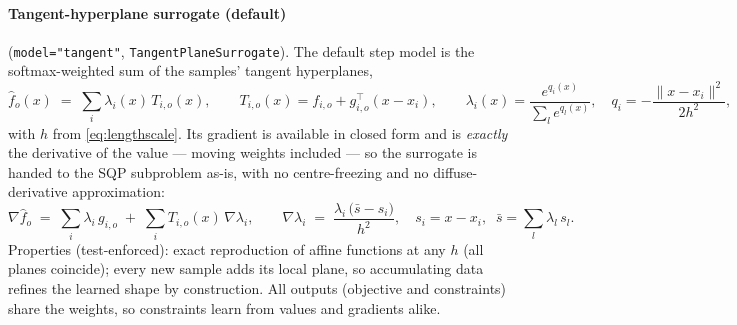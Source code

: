 \documentclass[11pt,a4paper]{article}
\newcommand{\code}[1]{\texttt{#1}}
\begin{document}
\paragraph{Tangent-hyperplane surrogate (default)}
(\code{model="tangent"}, \code{TangentPlaneSurrogate}). The default step
model is the softmax-weighted sum of the samples' tangent hyperplanes,
\begin{equation}
\hat f_o(x) \;=\; \sum_{i} \lambda_i(x)\, T_{i,o}(x), \qquad
T_{i,o}(x) = f_{i,o} + g_{i,o}^{\top}(x - x_i), \qquad
\lambda_i(x) = \frac{e^{q_i(x)}}{\sum_l e^{q_l(x)}}, \quad
q_i = -\frac{\lVert x - x_i\rVert^2}{2h^2},
\label{eq:tangent}
\end{equation}
with $h$ from \eqref{eq:lengthscale}. Its gradient is available in closed
form and is \emph{exactly} the derivative of the value --- moving weights
included --- so the surrogate is handed to the SQP subproblem as-is, with no
centre-freezing and no diffuse-derivative approximation:
\begin{equation}
\nabla \hat f_o \;=\; \sum_i \lambda_i\, g_{i,o}
\;+\; \sum_i T_{i,o}(x)\, \nabla\lambda_i,
\qquad
\nabla\lambda_i \;=\; \frac{\lambda_i\,\bigl(\bar s - s_i\bigr)}{h^2},
\quad s_i = x - x_i,\;\; \bar s = \sum_l \lambda_l\, s_l .
\end{equation}
Properties (test-enforced): exact reproduction of affine functions at any
$h$ (all planes coincide); every new sample adds its local plane, so
accumulating data refines the learned shape by construction. All outputs
(objective and constraints) share the weights, so constraints learn from
values and gradients alike.
\end{document}
